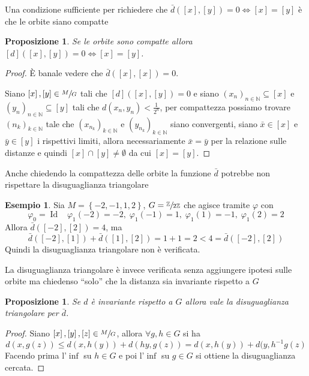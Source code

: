 \documentclass[a4paper,10pt]{article}
\newcounter{counter1}
\theoremstyle{plain}
\newtheorem{mypro}[counter1]{Proposizione}
\theoremstyle{definition}
\newtheorem{myes}[counter1]{Esempio}
\theoremstyle{remark}
\newcommand{\set}[1]{\left\{#1\right\}}
\newcommand{\pa}[1]{\left(#1\right)}
\newcommand{\bra}[1]{\left[#1\right]}
\DeclareMathOperator{\id}{Id}
\begin{document}
Una condizione sufficiente per richiedere che $\bar d (\bra{x} , \bra
{y} ) = 0 \Leftrightarrow \bra{x} = \bra{y}$ è che le orbite siano
compatte
\begin{mypro}
  Se le orbite sono compatte allora $\bra d (\bra{x},\bra{y}) = 0
  \Leftrightarrow \bra{x} = \bra{y}$.
\end{mypro}
\begin{proof}
  \`E banale vedere che $\bar d (\bra{x}, \bra{x} ) = 0$.

  Siano $\bra{x}, \bra{y} \in \sfrac{M}{G}$ tali che $\bra d
  (\bra{x},\bra{y}) = 0$ e siano $\pa{x_n}_ {n\in \mathbb{N}}
  \subseteq \bra{x}$ e $\pa{y_n}_ {n\in \mathbb{N}} \subseteq \bra{y}$
  tali che $d(x_n,y_n) < \frac{1}{2^n}$, per compattezza possiamo
  trovare $\pa{n_k} _{k\in \mathbb{N}}$ tale che $\pa{x_{n_k}}_{k\in
    \mathbb{N}}$ e $\pa{y_{n_k}}_{k\in \mathbb{N}}$ siano convergenti,
  siano $\bar x \in \bra{x}$ e $\bar y\in \bra{y}$ i rispettivi
  limiti, allora necessariamente $\bar x = \bar y$ per la relazione
  sulle distanze e quindi $\bra{x} \cap \bra{y} \neq \emptyset$ da cui
  $\bra{x} = \bra{y}$.
\end{proof}

Anche chiedendo la compattezza delle orbite la funzione $\bar d$
potrebbe non rispettare la disuguaglianza triangolare
\begin{myes}
  Sia $M = \set{ -2 , -1, 1, 2}$, $G =
  \sfrac{\mathbb{Z}}{2\mathbb{Z}}$ che agisce tramite $\varphi$ con
  \[ \varphi _0 = \id \;\;\; \varphi _1 (-2) = -2 ,\; \varphi _1 (-1)
  = 1 ,\; \varphi _1 (1) = -1 ,\; \varphi _1 (2) = 2 \]
  Allora $\bar d ( \bra{-2}, \bra{2}) = 4$, ma
  \[ \bar d (\bra{-2} , \bra{1} ) + \bar d (\bra{1} , \bra{2} ) = 1 + 1
  = 2 < 4 = \bar d ( \bra{-2}, \bra{2}) \]
  Quindi la disuguaglianza triangolare non è verificata.
\end{myes}

La disuguaglianza triangolare è invece verificata senza aggiungere
ipotesi sulle orbite ma chiedenso ``solo'' che la distanza sia
invariante rispetto a $G$
\begin{mypro}
  Se $d$ è invariante rispetto a $G$ allora vale la disuguaglianza
  triangolare per $\bar d$.
\end{mypro}
\begin{proof}
  Siano $\bra{x}, \bra{y}, \bra{z} \in \sfrac{M}{G}$, allora $\forall
  g,h \in G$ si ha
  \[ d(x,g(z)) \le d(x,h(y)) + d(hy,g(z)) = d(x,h(y)) +
  d(y,h^{-1}g(z) \]
  Facendo prima l'$\inf$ su $h\in G$ e poi l'$\inf$ su $g \in G$ si
  ottiene la disuguaglianza cercata.
\end{proof}
\end{document}

